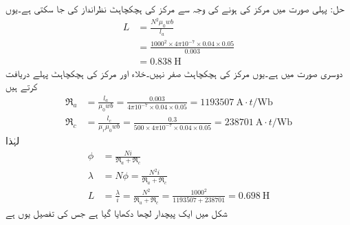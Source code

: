 حل:
	پہلی صورت میں مرکز کی  ہونے کی وجہ سے مرکز کی ہچکچاہٹ نظرانداز کی جا سکتی ہے۔یوں
\begin{align*}
L&=\frac{N^2 \mu_0 w b}{l_a}\\
&=\frac{1000^2 \times 4 \pi 10^{-7} \times 0.04 \times 0.05}{0.003}\\
&=\SI{0.838}{\henry}
\end{align*}
	دوسری صورت میں  ہے۔یوں مرکز کی ہچکچاہٹ صفر نہیں۔خلاء اور مرکز کی ہچکچاہٹ پہلے دریافت کرتے ہیں
\begin{align*}
\Re_a&=\frac{l_a}{\mu_0 w b}=\frac{0.003}{4\pi 10^{-7} \times 0.04 \times 0.05}=\SI{1193507}{\ampere \cdot t \per \weber}\\
\Re_c&=\frac{l_c}{\mu_r \mu_0 w b}=\frac{0.3}{500 \times 4\pi 10^{-7} \times 0.04 \times 0.05}=\SI{238701}{\ampere \cdot t \per \weber}
\end{align*}
لہٰذا
\begin{align*}
\phi&=\frac{N i}{\Re_a+\Re_c}\\
\lambda &= N \phi = \frac{N^2 i}{\Re_a+\Re_c}\\
L&=\frac{\lambda}{i}=\frac{N^2}{\Re_a+\Re_c}=\frac{1000^2}{\num{1193507}+\num{238701}}=\SI{0.698}{\henry}
\end{align*}
%
شکل  میں ایک پیچدار لچھا دکھایا گیا ہے جس کی تفصیل یوں ہے


